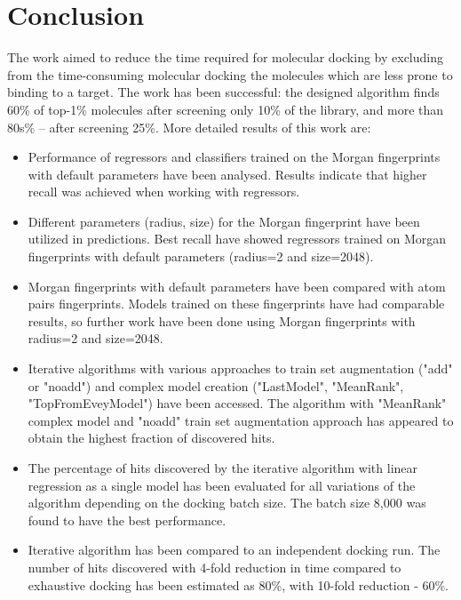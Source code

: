 \chapter{Conclusion}

The work aimed to reduce the time required for molecular docking by excluding from the time-consuming molecular docking
the molecules which are less prone to binding to a target.
The work has been successful: the designed algorithm finds 60\% of top-1\% molecules after screening only 10\% of the library, and more than 80s\% -- after screening 25\%.
More detailed results of this work are:

\begin{itemize}
    \item Performance of regressors and classifiers trained on the Morgan fingerprints with default parameters have been analysed.
    Results indicate that higher recall was achieved when working with regressors.
    \item Different parameters (radius, size) for the Morgan fingerprint have been utilized in predictions.
    Best recall have showed regressors trained on Morgan fingerprints with default parameters (radius=2 and size=2048).
    \item Morgan fingerprints with default parameters have been compared with atom pairs fingerprints.
    Models trained on these fingerprints have had comparable results, so further work have been done using Morgan fingerprints with radius=2 and size=2048.
    \item Iterative algorithms with various approaches to train set augmentation ("add" or "noadd") and complex model creation ("LastModel", "MeanRank", "TopFromEveyModel") have been accessed.
    The algorithm with "MeanRank" complex model and "noadd" train set augmentation approach has appeared to obtain the highest fraction of discovered hits.
    \item The percentage of hits discovered by the iterative algorithm with linear regression as a single model has been evaluated for all variations of the algorithm depending on the docking batch size.
	The batch size 8,000 was found to have the best performance.
    \item Iterative algorithm has been compared to an independent docking run.
    The number of hits discovered with 4-fold reduction in time compared to exhaustive docking has been estimated as 80\%, with 10-fold reduction - 60\%.
\end{itemize}
